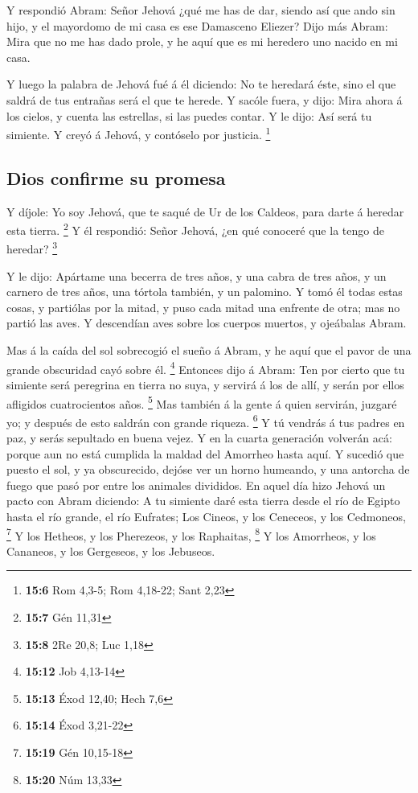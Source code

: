  Y respondió Abram: Señor Jehová ¿qué me has de dar, siendo
así que ando sin hijo, y el mayordomo de mi casa es ese Damasceno
Eliezer?  Dijo más Abram: Mira que no me has dado prole, y
he aquí que es mi heredero uno nacido en mi casa.

 Y luego la palabra de Jehová fué á él diciendo: No te
heredará éste, sino el que saldrá de tus entrañas será el que te herede.
 Y sacóle fuera, y dijo: Mira ahora á los cielos, y cuenta
las estrellas, si las puedes contar. Y le dijo: Así será tu simiente.
 Y creyó á Jehová, y contóselo por justicia. \footnote{\textbf{15:6}
  Rom 4,3-5; Rom 4,18-22; Sant 2,23}

\hypertarget{dios-confirme-su-promesa}{%
\subsection{Dios confirme su promesa}\label{dios-confirme-su-promesa}}

 Y díjole: Yo soy Jehová, que te saqué de Ur de los Caldeos,
para darte á heredar esta tierra. \footnote{\textbf{15:7} Gén 11,31}
 Y él respondió: Señor Jehová, ¿en qué conoceré que la tengo
de heredar? \footnote{\textbf{15:8} 2Re 20,8; Luc 1,18}

 Y le dijo: Apártame una becerra de tres años, y una cabra
de tres años, y un carnero de tres años, una tórtola también, y un
palomino.  Y tomó él todas estas cosas, y partiólas por la
mitad, y puso cada mitad una enfrente de otra; mas no partió las aves.
 Y descendían aves sobre los cuerpos muertos, y ojeábalas
Abram.

 Mas á la caída del sol sobrecogió el sueño á Abram, y he
aquí que el pavor de una grande obscuridad cayó sobre él. \footnote{\textbf{15:12}
  Job 4,13-14}  Entonces dijo á Abram: Ten por cierto que
tu simiente será peregrina en tierra no suya, y servirá á los de allí, y
serán por ellos afligidos cuatrocientos años. \footnote{\textbf{15:13}
  Éxod 12,40; Hech 7,6}  Mas también á la gente á quien
servirán, juzgaré yo; y después de esto saldrán con grande riqueza.
\footnote{\textbf{15:14} Éxod 3,21-22}  Y tú vendrás á tus
padres en paz, y serás sepultado en buena vejez.  Y en la
cuarta generación volverán acá: porque aun no está cumplida la maldad
del Amorrheo hasta aquí.  Y sucedió que puesto el sol, y ya
obscurecido, dejóse ver un horno humeando, y una antorcha de fuego que
pasó por entre los animales divididos.  En aquel día hizo
Jehová un pacto con Abram diciendo: A tu simiente daré esta tierra desde
el río de Egipto hasta el río grande, el río Eufrates;  Los
Cineos, y los Ceneceos, y los Cedmoneos, \footnote{\textbf{15:19} Gén
  10,15-18}  Y los Hetheos, y los Pherezeos, y los
Raphaitas, \footnote{\textbf{15:20} Núm 13,33}  Y los
Amorrheos, y los Cananeos, y los Gergeseos, y los Jebuseos.

